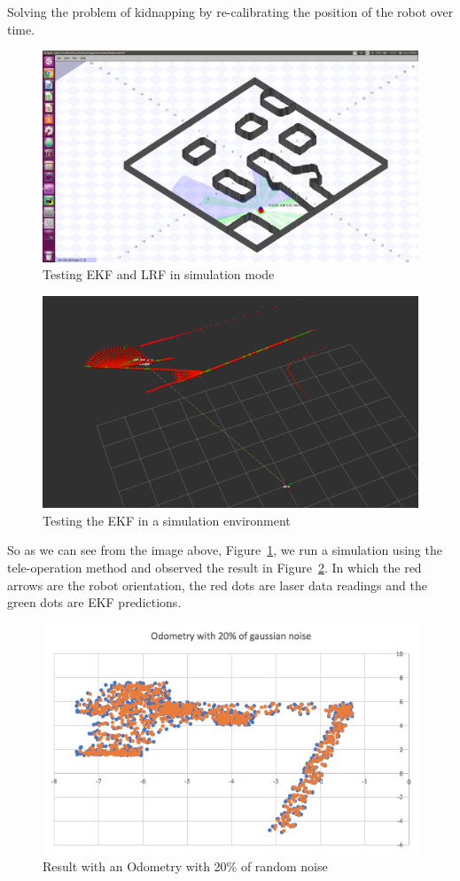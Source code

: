 \documentclass[a4paper]{IEEEtran}
\begin{document}
Solving the problem of kidnapping by re-calibrating the position of the robot over time.

\begin{figure}[!ht]
  \centering
  \includegraphics[width=0.8\columnwidth]{./simulation}
  \caption{Testing EKF and LRF in simulation mode}
  \label{fig:simulation}
\end{figure}

\begin{figure}[!ht]
  \centering
  \includegraphics[width=0.8\columnwidth]{./rviz}
  \caption{Testing the EKF in a simulation environment}
  \label{fig:rviz}
\end{figure}

So as we can see from the image above, Figure~\ref{fig:simulation}, we run a simulation using the tele-operation method and observed the result in Figure~\ref{fig:rviz}. In which the red arrows are the robot orientation, the red dots are laser data readings and the green dots are EKF predictions.\\

\begin{figure}[!ht]
  \centering
  \includegraphics[width=0.8\columnwidth]{./odometry20}
  \caption{Result with an Odometry with 20\% of random noise}
  \label{fig:odometry20}
\end{figure}
\end{document}
